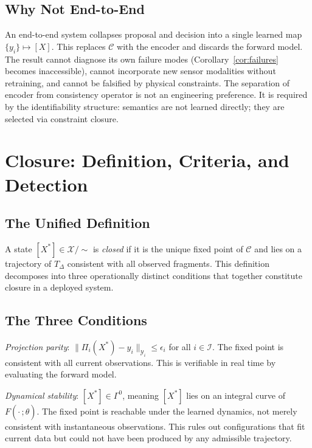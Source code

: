 \documentclass[11pt, oneside]{article}
\newcommand{\Xmod}{\mathcal{X}/{\sim}}
\begin{document}
\subsection{Why Not End-to-End}

An end-to-end system collapses proposal and decision into a single learned map
$\{y_i\} \mapsto [X]$. This replaces $\mathcal{C}$ with the encoder and discards the
forward model. The result cannot diagnose its own failure modes (Corollary~\ref{cor:failures}
becomes inaccessible), cannot incorporate new sensor modalities without retraining, and
cannot be falsified by physical constraints. The separation of encoder from consistency
operator is not an engineering preference. It is required by the identifiability
structure: semantics are not learned directly; they are selected via constraint closure.

\section{Closure: Definition, Criteria, and Detection}
\label{sec:closure}

\subsection{The Unified Definition}

A state $[X^*] \in \Xmod$ is \emph{closed} if it is the unique fixed point of
$\mathcal{C}$ and lies on a trajectory of $T_\Delta$ consistent with all observed
fragments. This definition decomposes into three operationally distinct conditions that
together constitute closure in a deployed system.

\subsection{The Three Conditions}

\emph{Projection parity}: $\|\Pi_i(X^*) - y_i\|_{\mathcal{Y}_i} \le \epsilon_i$ for
all $i \in \mathcal{I}$. The fixed point is consistent with all current observations.
This is verifiable in real time by evaluating the forward model.

\emph{Dynamical stability}: $[X^*] \in \Gamma^0$, meaning $[X^*]$ lies on an integral
curve of $F(\cdot\,;\hat{\theta})$. The fixed point is reachable under the learned
dynamics, not merely consistent with instantaneous observations. This rules out
configurations that fit current data but could not have been produced by any admissible
trajectory.
\end{document}
